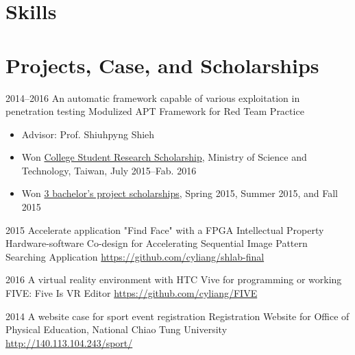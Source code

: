 \documentclass[11pt,a4paper,sans,english]{moderncv}
\begin{document}
\section{Skills}
        
\section{Projects, Case, and Scholarships}
    \cventry
        {2014--2016} %
        {An automatic framework capable of various exploitation in penetration testing} %
        {Modulized APT Framework for Red Team Practice} %
        {}
        {} %
        {\begin{itemize}
        \item Advisor: Prof. Shiuhpyng Shieh
        \item Won \underline{College Student Research Scholarship}, Ministry of Science and Technology, Taiwan, July 2015--Fab. 2016
        \item Won \underline{3 bachelor's project scholarships}, Spring 2015, Summer 2015, and Fall 2015
        \end{itemize}%
        }
        
    \cventry
        {2015}
        {Accelerate application "Find Face" with a FPGA Intellectual Property}
        {Hardware-software Co-design for Accelerating Sequential Image Pattern Searching Application}
        {}
        {\href{https://github.com/cyliang/shlab-final}{\textnormal{https://github.com/cyliang/shlab-final}}}
        {}

    \cventry
        {2016}
        {A virtual reality environment with HTC Vive for programming or working}
        {FIVE: Five Is VR Editor}
        {}
        {\href{https://github.com/cyliang/FIVE}{\textnormal{https://github.com/cyliang/FIVE}}}
        {}
        
    \cventry
        {2014}
        {A website case for sport event registration}
        {Registration Website for Office of Physical Education, National Chiao Tung University}
        {}
        {\href{http://140.113.104.243/sport/}{\textnormal{http://140.113.104.243/sport/}}}
        {}
        
\end{document}
